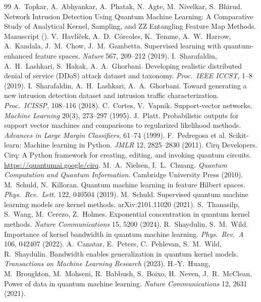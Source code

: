 \begin{thebibliography}{99}\small
{} A.~Topkar, A.~Abhyankar, A.~Phatak, N.~Agte, M.~Nivelkar, S.~Bhirud.
  Network Intrusion Detection Using Quantum Machine Learning: A Comparative Study of Analytical
  Kernel, Sampling, and ZZ Entangling Feature Map Methods. Manuscript ().
 V.~Havlíček, A.~D.~Córcoles, K.~Temme, A.~W.~Harrow, A.~Kandala, J.~M.~Chow,
  J.~M.~Gambetta. Supervised learning with quantum-enhanced feature spaces. \emph{Nature} 567, 209--212 (2019).
 I.~Sharafaldin, A.~H.~Lashkari, S.~Hakak, A.~A.~Ghorbani. Developing
  realistic distributed denial of service (DDoS) attack dataset and taxonomy. \emph{Proc.\ IEEE ICCST}, 1--8 (2019).
 I.~Sharafaldin, A.~H.~Lashkari, A.~A.~Ghorbani. Toward generating a new
  intrusion detection dataset and intrusion traffic characterization. \emph{Proc.\ ICISSP}, 108--116 (2018).
 C.~Cortes, V.~Vapnik. Support-vector networks. \emph{Machine Learning} 20(3), 273--297 (1995).
 J.~Platt. Probabilistic outputs for support vector machines and comparisons to
  regularized likelihood methods. \emph{Advances in Large Margin Classifiers}, 61--74 (1999).
 F.~Pedregosa et al. Scikit-learn: Machine learning in Python. \emph{JMLR} 12, 2825--2830 (2011).
 Cirq Developers. Cirq: A Python framework for creating, editing, and invoking
  quantum circuits. \url{https://quantumai.google/cirq}.
 M.~A.~Nielsen, I.~L.~Chuang. \emph{Quantum Computation and Quantum Information}.
  Cambridge University Press (2010).
 M.~Schuld, N.~Killoran. Quantum machine learning in feature Hilbert spaces.
  \emph{Phys.\ Rev.\ Lett.} 122, 040504 (2019).
 M.~Schuld. Supervised quantum machine learning models are kernel methods.
  arXiv:2101.11020 (2021).
 S.~Thanasilp, S.~Wang, M.~Cerezo, Z.~Holmes. Exponential concentration in
  quantum kernel methods. \emph{Nature Communications} 15, 5200 (2024).
 R.~Shaydulin, S.~M.~Wild. Importance of kernel bandwidth in quantum machine
  learning. \emph{Phys.\ Rev.\ A} 106, 042407 (2022).
 A.~Canatar, E.~Peters, C.~Pehlevan, S.~M.~Wild, R.~Shaydulin. Bandwidth enables
  generalization in quantum kernel models. \emph{Transactions on Machine Learning Research} (2023).
 H.-Y.~Huang, M.~Broughton, M.~Mohseni, R.~Babbush, S.~Boixo, H.~Neven,
  J.~R.~McClean. Power of data in quantum machine learning. \emph{Nature Communications} 12, 2631 (2021).

\end{thebibliography}
